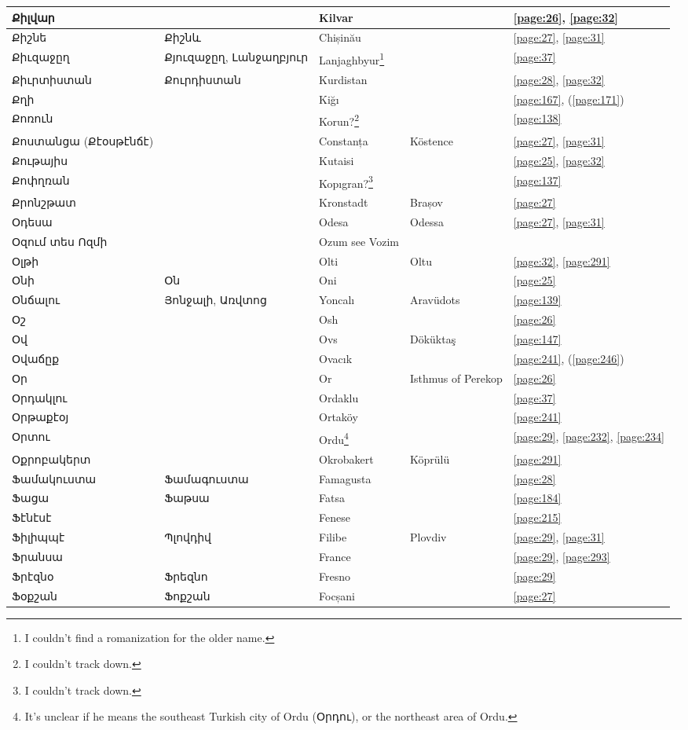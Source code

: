 \begin{center}
\begin{longtable}{|p{}|p{3cm}|p{3cm}|p{2cm}|p{3cm}|}
	Քիլվար& & Kilvar& &\ref{page:26}, \ref{page:32}\\ \hline
	Քիշնե& Քիշնև& Chișinău& &\ref{page:27}, \ref{page:31}\\ \hline
	Քիւզաջըղ& Քյուզաջըղ, Լանջաղբյուր& Lanjaghbyur\footnote{I couldn't find a romanization for the older name.} & &\ref{page:37}\\ \hline
	Քիւրտիստան& Քուրդիստան&Kurdistan & &\ref{page:28}, \ref{page:32}\\ \hline
	Քղի& &Kiğı & &\ref{page:167}, (\ref{page:171})\\ \hline
	Քոռուն& & Korun?\footnote{I couldn't track down.}& &\ref{page:138}\\ \hline
	Քոստանցա (Քէօսթէնճէ)&& Constanța& Köstence&   \ref{page:27}, \ref{page:31}\\ \hline
	Քութայիս& & Kutaisi& &\ref{page:25}, \ref{page:32}\\ \hline
	Քոփղռան& &Kopıgran?\footnote{I couldn't track down.} & &\ref{page:137}\\ \hline
	Քրոնշթատ& & Kronstadt& Brașov &\ref{page:27}\\ \hline
	Օդեսա& &Odesa &Odessa &\ref{page:27}, \ref{page:31}\\ \hline
	Օզում տես Ոզմի& &Ozum see Vozim & &\\ \hline
	Օլթի& & Olti &Oltu &\ref{page:32}, \ref{page:291}\\ \hline
	Օնի& Օն&Oni & &\ref{page:25}\\ \hline
	Օնճալու&Յոնջալի, Առվտոց &Yoncalı &Aravüdots &\ref{page:139}\\ \hline
	Օշ& & Osh& &\ref{page:26}\\ \hline
	Օվ& &Ovs & Döküktaş&\ref{page:147}\\ \hline
	Օվաճըք& & Ovacık& &\ref{page:241}, (\ref{page:246})\\ \hline
	Օր& &  Or&Isthmus of Perekop &\ref{page:26}\\ \hline
	Օրդակլու& &Ordaklu & &\ref{page:37}\\ \hline
	Օրթաքէօյ& &Ortaköy & &\ref{page:241}\\ \hline
	Օրտու& & Ordu\footnote{It's unclear if he means the southeast Turkish city of Ordu (Օրդու), or the northeast area of Ordu.}& &\ref{page:29}, \ref{page:232}, \ref{page:234}\\ \hline
	Օքրոբակերտ& & Okrobakert&Köprülü &\ref{page:291}\\ \hline
	Ֆամակուստա& Ֆամագուստա&Famagusta & &\ref{page:28}\\ \hline
	Ֆացա&Ֆաթսա &Fatsa & &\ref{page:184}\\ \hline
	Ֆէնէսէ& & Fenese& &\ref{page:215}\\ \hline
	Ֆիլիպպէ& Պլովդիվ&Filibe &Plovdiv &\ref{page:29}, \ref{page:31}\\ \hline
	Ֆրանսա& &France & &\ref{page:29}, \ref{page:293}\\ \hline
	Ֆրէզնօ&   Ֆրեզնո & Fresno& &\ref{page:29}\\ \hline
	Ֆօքշան& Ֆոքշան &Focșani& &\ref{page:27}\\ \hline
	\hline
 \end{longtable}
\end{center}


